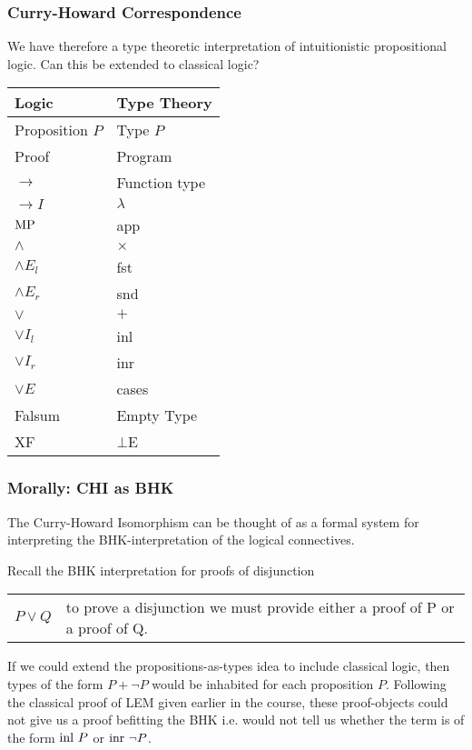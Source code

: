 \documentclass{beamer}
\theoremstyle{indentDefn} \newtheorem{defn}[]{Definition}
\begin{document}
\begin{frame}
  \frametitle{Curry-Howard Correspondence}

	We have therefore a type theoretic interpretation of intuitionistic propositional logic. Can this be extended to classical logic?

  \begin{center}
    \begin{tabular}{l|l}
      Logic & Type Theory \\
      \hline
      Proposition $P$ & Type $P$ \\
      Proof & Program \\
      $\to$ & Function type \\
      $\to I$ & $\lambda$ \\
      $\text{MP}$ & app \\
      $\land$ & $\times$ \\
      $\land E_{l}$ & fst \\
      $\land E_{r}$ & snd \\
      $\lor$ & $+$\\ 
      $\lor I_{l}$ & inl \\
      $\lor I_{r}$ & inr \\
      $\lor E$ & cases  \\
      Falsum & Empty Type \\
      XF & $\bot$E
    \end{tabular}
  \end{center}

\end{frame}

\begin{frame}
  \frametitle{Morally: CHI as BHK}

  The Curry-Howard Isomorphism can be thought of as a formal system for interpreting the BHK-interpretation of the logical connectives. 

  Recall the BHK interpretation for proofs of disjunction 

  \begin{center}
    \begin{tabular}{p{1.5cm}p{8cm}}
      $P \lor Q$ & to prove a disjunction we must provide either a proof of P or a proof of Q. 
    \end{tabular}
  \end{center}

  If we could extend the propositions-as-types idea to include classical logic, then types of the form $P + \lnot P$ would be inhabited for each proposition $P$. Following the classical proof of LEM given earlier in the course, these proof-objects could not give us a proof befitting the BHK i.e. would not tell us whether the term is of the form $\text{inl } P$ or $\text{inr } \lnot P$.

\end{frame}
\end{document}
